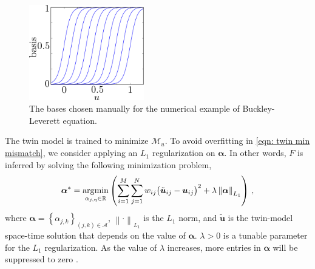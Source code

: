 \begin{figure}[htbp]
    \begin{center}
        \includegraphics[width=5cm]{../fixed_basis_eg.png}
        \caption{The bases chosen manually for the numerical example of Buckley-Leverett equation.}
        \label{fig: sigmoid basis ad hoc}
    \end{center}
\end{figure}


The twin model is trained to minimize $\mathcal{M}_u$.
To avoid overfitting in \eqref{eqn: twin min mismatch}, we consider applying an
$L_1$ regularization on $\boldsymbol{\alpha}$. In other words,
$F$ is inferred by solving the following minimization problem,
\begin{equation}
    \boldsymbol{\alpha}^* = \operatorname*{\arg\!\min}_{\alpha_{j, \eta}\in \mathbb{R}} \left(
    \sum_{i=1}^M \sum_{j=1}^N w_{ij} \big( \tilde{\boldsymbol{u}}_{ij}
     -\boldsymbol{u}_{ij}\big)^2
 + \lambda\left\|\boldsymbol{\alpha}\right\|_{L_1} \right)
    \,,
    \label{eqn: solution mismatch L1 norm}
\end{equation}
where $\boldsymbol{\alpha} = \left\{\alpha_{j,k}\right\}_{\left(j,k\right)\in \mathcal{A}}$, 
$\left\|\cdot\right\|_{L_1}$ is the $L_1$ norm, and
$\tilde{\boldsymbol{u}}$ is the twin-model space-time solution that depends on the value of
$\boldsymbol{\alpha}$.
$\lambda>0$ is a tunable parameter for
the $L_1$ regularization. As the value of $\lambda$ increases, more entries in $\boldsymbol{\alpha}$
will be suppressed to zero
\cite{Lasso variable selection}. \\



